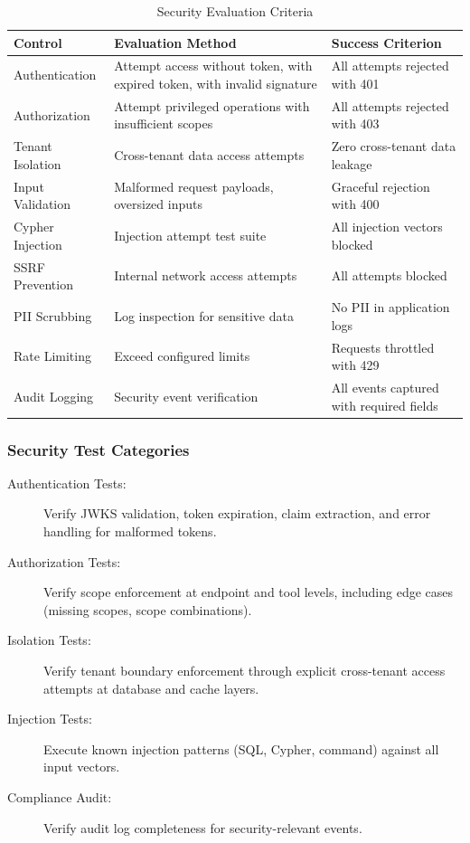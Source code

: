 \begin{table}[htbp]
\centering
\caption{Security Evaluation Criteria}
\label{tab:security-eval}
\small
\begin{tabularx}{\textwidth}{|l|X|l|}
\hline
\textbf{Control} & \textbf{Evaluation Method} & \textbf{Success Criterion} \\
\hline
Authentication & Attempt access without token, with expired token, with invalid signature & All attempts rejected with 401 \\
\hline
Authorization & Attempt privileged operations with insufficient scopes & All attempts rejected with 403 \\
\hline
Tenant Isolation & Cross-tenant data access attempts & Zero cross-tenant data leakage \\
\hline
Input Validation & Malformed request payloads, oversized inputs & Graceful rejection with 400 \\
\hline
Cypher Injection & Injection attempt test suite & All injection vectors blocked \\
\hline
SSRF Prevention & Internal network access attempts & All attempts blocked \\
\hline
PII Scrubbing & Log inspection for sensitive data & No PII in application logs \\
\hline
Rate Limiting & Exceed configured limits & Requests throttled with 429 \\
\hline
Audit Logging & Security event verification & All events captured with required fields \\
\hline
\end{tabularx}
\end{table}

\subsubsection{Security Test Categories}

\begin{description}
    \item[Authentication Tests:] Verify JWKS validation, token expiration, claim extraction, and error handling for malformed tokens.
    
    \item[Authorization Tests:] Verify scope enforcement at endpoint and tool levels, including edge cases (missing scopes, scope combinations).
    
    \item[Isolation Tests:] Verify tenant boundary enforcement through explicit cross-tenant access attempts at database and cache layers.
    
    \item[Injection Tests:] Execute known injection patterns (SQL, Cypher, command) against all input vectors.
    
    \item[Compliance Audit:] Verify audit log completeness for security-relevant events.
\end{description}

